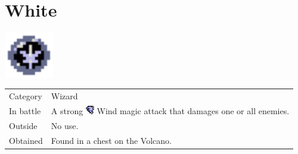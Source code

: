 \section{White}
\label{spell:white}

\includegraphics[height=2cm,keepaspectratio]{./resources/spells/white}

\begin{longtable}{ l p{9cm} }
	Category
	& Wizard
\\ %
	In battle
	& A strong \includegraphics[height=1em,keepaspectratio]{./resources/effects/wind} Wind magic attack that damages one or all enemies.
\\ %
	Outside
	& No use.
\\ %
	Obtained
	& Found in a chest on the Volcano.
\end{longtable}
